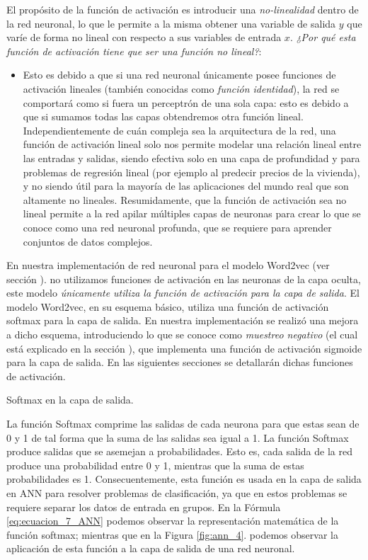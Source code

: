 \documentclass[12pt,a4paper]{article}
\makeatletter
\renewcommand\paragraph{\@startsection{paragraph}{4}{\z@}
            {-2.5ex\@plus -1ex \@minus -.25ex}
            {1.25ex \@plus .25ex}
            {\normalfont\normalsize\bfseries}}
\makeatother
\begin{document}
\begin{sloppypar}
El propósito de la función de activación es introducir una \textit{no-linealidad} dentro de la red neuronal, lo que le permite a la misma obtener una variable de salida $y$ que varíe de forma no lineal con respecto a sus variables de entrada $x$. \textit{¿Por qué esta función de activación tiene que ser una función no lineal?}:
\begin{itemize}
\item Esto es debido a que si una red neuronal únicamente posee funciones de activación lineales (también conocidas como \textit{función identidad}), la red se comportará como si fuera un perceptrón de una sola capa: esto es debido a que si sumamos todas las capas obtendremos otra función lineal.
Independientemente de cuán compleja sea la arquitectura de la red, una función de activación lineal solo nos permite modelar una relación lineal entre las entradas y salidas, siendo efectiva solo en una capa de profundidad y para problemas de regresión lineal (por ejemplo al predecir precios de la vivienda), y no siendo útil para la mayoría de las aplicaciones del mundo real que son altamente no lineales.
Resumidamente, que la función de activación sea no lineal permite a la red apilar múltiples capas de neuronas para crear lo que se conoce como una red neuronal profunda, que se requiere para aprender conjuntos de datos complejos.
\end{itemize}

En nuestra implementación de red neuronal para el modelo Word2vec (ver sección \textit{}). no utilizamos funciones de activación en las neuronas de la capa oculta, este modelo \textit{únicamente utiliza la función de activación para la capa de salida}. 
El modelo Word2vec, en su esquema básico, utiliza una función de activación softmax para la capa de salida. En nuestra implementación se realizó una mejora a dicho esquema, introduciendo lo que se conoce como \textit{muestreo negativo} (el cual está explicado en la sección \textit{}), que implementa una función de activación sigmoide para la capa de salida. En las siguientes secciones se detallarán dichas funciones de activación.

\paragraph{Softmax en la capa de salida.}\label{soft_capa_salida}

La función Softmax comprime las salidas de cada neurona para que estas sean de 0 y 1 de tal forma que la suma de las salidas sea igual a 1. La función Softmax produce salidas que se asemejan a probabilidades. Esto es, cada salida de la red produce una probabilidad entre 0 y 1, mientras que la suma de estas probabilidades es 1. Consecuentemente, esta función es usada en la capa de salida en ANN para resolver problemas de clasificación, ya que en estos problemas se requiere separar los datos de entrada en grupos. 
En la Fórmula \ref{eq:ecuacion_7_ANN} podemos observar la representación matemática de la función softmax; mientras que en la Figura \ref{fig:ann_4}. podemos observar la aplicación de esta función a la capa de salida de una red neuronal.


\end{sloppypar}
\end{document}
